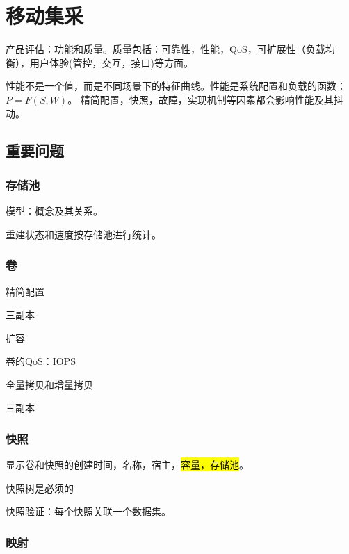 \chapter{移动集采}

产品评估：功能和质量。质量包括：可靠性，性能，QoS，可扩展性（负载均衡），用户体验(管控，交互，接口)等方面。

性能不是一个值，而是不同场景下的特征曲线。性能是系统配置和负载的函数：$P=F(S, W)$。
精简配置，快照，故障，实现机制等因素都会影响性能及其抖动。

\section{重要问题}

\subsection{存储池}

模型：概念及其关系。

重建状态和速度按存储池进行统计。

\subsection{卷}

\begin{enumbox}
    \item 精简配置
    \item 三副本
    \item 扩容
    \item 卷的QoS：IOPS
    \item 全量拷贝和增量拷贝
\end{enumbox}

三副本 

\subsection{快照}

\begin{enumbox}
    \item 显示卷和快照的创建时间，名称，宿主，\hl{容量，存储池}。
    \item 快照树是必须的
    \item 快照验证：每个快照关联一个数据集。
\end{enumbox}

\subsection{映射}

